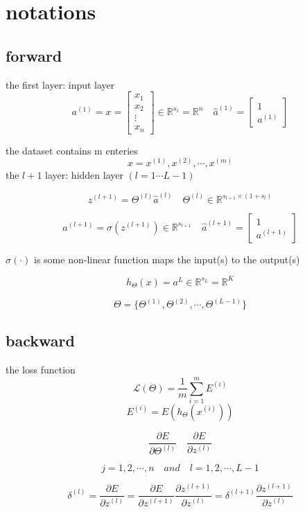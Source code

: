 \documentclass[12pt,a4paper]{article}
\begin{document}
\section{notations}

\subsection{forward}
the first layer: input layer
\[
a^{(1)} = x = \begin{bmatrix}
x_1 \\ x_2 \\ \vdots \\ x_n
\end{bmatrix} \in \mathbb{R}^{s_1} = \mathbb{R}^{n}\quad
\hat{a}^{(1)} = \begin{bmatrix}
1 \\ a^{(1)}
\end{bmatrix}
\]

the dataset contains m enteries
\[
x = x^{(1)}, x^{(2)}, \cdots, x^{(m)}
\]
the $l+1$ layer: hidden layer $(l = 1 \cdots L-1)$

\[
z^{(l+1)} = \Theta^{(l)}\hat{a}^{(l)} \quad 
\Theta^{(l)} \in \mathbb{R}^{s_{l+1} \times (1+s_{l})}
\]

\[
a^{(l+1)} = \sigma(z^{(l+1)}) \in \mathbb{R}^{s_{l+1}}\quad
\hat{a}^{(l+1)} = \begin{bmatrix}
1 \\ a^{(l+1)} 
\end{bmatrix}
\]

$\sigma(\cdot)$ is some non-linear function maps the input(s) to the output(s) 


\[
h_{\Theta}(x) = a^{L} \in \mathbb{R}^{s_L} = \mathbb{R}^{K}
\]

\[
\Theta = \{\Theta^{(1)},\Theta^{(2)},\cdots,\Theta^{(L-1)}\}
\]


\subsection{backward}

the loss function
\[
\mathcal{L}(\Theta) = \frac{1}{m}\sum_{i=1}^{m}E^{(i)}
\]
\[
E^{(i)} = E(h_{\Theta}(x^{(i)}))
\]

\[
\frac{\partial E}{\partial \Theta^{(l)}}  \quad 
\frac{\partial E}{\partial z^{(l)}} 
\]

\[
j = 1,2, \cdots,  n \quad and \quad l = 1,2, \cdots, L-1
\]

\[
\delta^{(l)} = 
\frac{\partial E}{\partial z^{(l)}}  = \frac{\partial E}{\partial z^{(l+1)}}\frac{\partial z^{(l+1)}}{\partial z^{(l)}} = \delta^{(l+1)}\frac{\partial z^{(l+1)}}{\partial z^{(l)}}
\]
\end{document}
